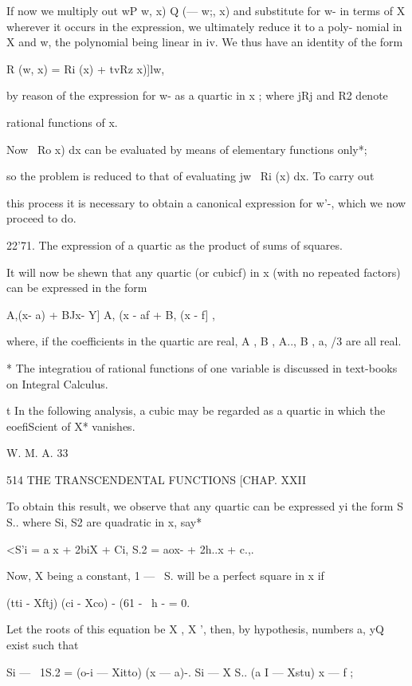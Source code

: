 If now we multiply out wP  w, x) Q (— w;, x) and substitute for w- in terms 
of X wherever it occurs in the expression, we ultimately reduce it to a poly- 
nomial in X and w, the polynomial being linear in iv. We thus have an 
identity of the form 

R (w, x) =  Ri (x) + tvRz  x)]lw, 

by reason of the expression for w- as a quartic in x ; where jRj and R2 denote 

rational functions of x. 



Now \ Ro  x) dx can be evaluated by means of elementary functions only*; 

so the problem is reduced to that of evaluating jw~ Ri (x) dx. To carry out 

this process it is necessary to obtain a canonical expression for w'-, which we 
now proceed to do. 

22'71. The expression of a quartic as the product of sums of squares. 

It will now be shewn that any quartic (or cubicf) in x (with no repeated 
factors) can be expressed in the form 

 A,(x- a)  + BJx-  Y]  A, (x - af + B, (x -  f] , 

where, if the coefficients in the quartic are real, A , B , A.., B , a, /3 are all 
real. 

* The integratiou of rational functions of one variable is discussed in text-books on Integral 
Calculus. 

t In the following analysis, a cubic may be regarded as a quartic in which the eoefiScient of 
X* vanishes. 

W. M. A. 33 



514 THE TRANSCENDENTAL FUNCTIONS [CHAP. XXII 

To obtain this result, we observe that any quartic can be expressed yi 
the form S S.. where Si, S2 are quadratic in x, say* 

<S'i = a x  + 2biX + Ci, S.2 = aox- + 2h..x + c.,. 

Now, X being a constant,  1 — \ S. will be a perfect square in x if 

(tti - Xftj) (ci - Xco) - (61 - \ h - = 0. 

Let the roots of this equation be X , X ', then, by hypothesis, numbers 
a, yQ exist such that 

Si — \ 1S.2 = (o-i — Xitto) (x — a)-. Si — X S..  (a I — Xstu)  x —  f ; 

